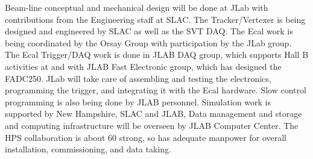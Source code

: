 \documentclass[11pt]{report}
\begin{document}
Beam-line conceptual  and mechanical design will be done at JLab with contributions from the Engineering staff at SLAC.
The Tracker/Vertexer is being designed and engineered by SLAC as well as 
the SVT DAQ. The Ecal work is being coordinated by the Orsay Group 
with participation by the JLab group.  
The Ecal Trigger/DAQ work is done in JLAB DAQ group, which supports Hall B activities at  and with JLAB Fast Electronic group, which has designed the FADC250.
JLab will take care of  assembling and testing the electronics, programming the trigger, and integrating it with 
the Ecal hardware. Slow control programming is also being done by JLAB personnel.
Simulation work is supported by New Hampshire, SLAC and JLAB,  Data management and storage and computing infrastructure will be overseen by JLAB Computer Center.
The HPS collaboration is about 60 strong, so has adequate manpower for overall installation, commissioning, and data taking. 
\end{document}
